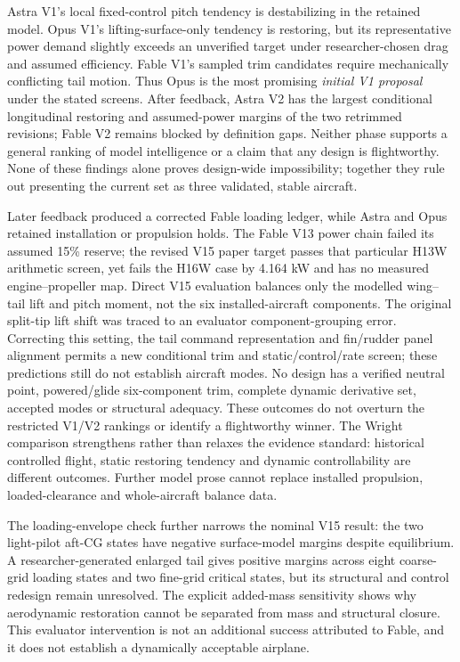 \documentclass[10pt,letterpaper]{article}
\begin{document}
Astra V1's local fixed-control pitch tendency is destabilizing in the retained model. Opus V1's lifting-surface-only tendency is restoring, but its representative power demand slightly exceeds an unverified target under researcher-chosen drag and assumed efficiency. Fable V1's sampled trim candidates require mechanically conflicting tail motion. Thus Opus is the most promising \emph{initial V1 proposal} under the stated screens. After feedback, Astra V2 has the largest conditional longitudinal restoring and assumed-power margins of the two retrimmed revisions; Fable V2 remains blocked by definition gaps. Neither phase supports a general ranking of model intelligence or a claim that any design is flightworthy. None of these findings alone proves design-wide impossibility; together they rule out presenting the current set as three validated, stable aircraft.

Later feedback produced a corrected Fable loading ledger, while Astra and Opus retained installation or propulsion holds. The Fable V13 power chain failed its assumed 15\% reserve; the revised V15 paper target passes that particular H13W arithmetic screen, yet fails the H16W case by 4.164 kW and has no measured engine--propeller map. Direct V15 evaluation balances only the modelled wing--tail lift and pitch moment, not the six installed-aircraft components. The original split-tip lift shift was traced to an evaluator component-grouping error. Correcting this setting, the tail command representation and fin/rudder panel alignment permits a new conditional trim and static/control/rate screen; these predictions still do not establish aircraft modes. No design has a verified neutral point, powered/glide six-component trim, complete dynamic derivative set, accepted modes or structural adequacy. These outcomes do not overturn the restricted V1/V2 rankings or identify a flightworthy winner. The Wright comparison strengthens rather than relaxes the evidence standard: historical controlled flight, static restoring tendency and dynamic controllability are different outcomes. Further model prose cannot replace installed propulsion, loaded-clearance and whole-aircraft balance data.

The loading-envelope check further narrows the nominal V15 result: the two light-pilot aft-CG states have negative surface-model margins despite equilibrium. A researcher-generated enlarged tail gives positive margins across eight coarse-grid loading states and two fine-grid critical states, but its structural and control redesign remain unresolved. The explicit added-mass sensitivity shows why aerodynamic restoration cannot be separated from mass and structural closure. This evaluator intervention is not an additional success attributed to Fable, and it does not establish a dynamically acceptable airplane.
\end{document}
